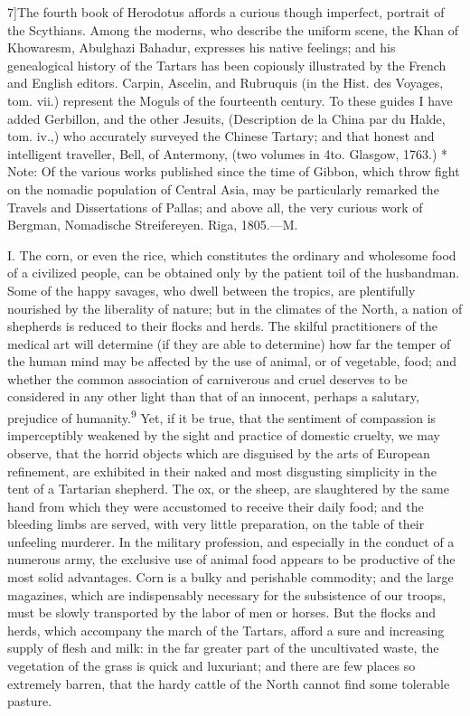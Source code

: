 7]{The fourth book of Herodotus affords a curious
though imperfect, portrait of the Scythians. Among the moderns,
who describe the uniform scene, the Khan of Khowaresm, Abulghazi
Bahadur, expresses his native feelings; and his genealogical
history of the Tartars has been copiously illustrated by the
French and English editors. Carpin, Ascelin, and Rubruquis (in
the Hist. des Voyages, tom. vii.) represent the Moguls of the
fourteenth century. To these guides I have added Gerbillon, and
the other Jesuits, (Description de la China par du Halde, tom.
iv.,) who accurately surveyed the Chinese Tartary; and that
honest and intelligent traveller, Bell, of Antermony, (two
volumes in 4to. Glasgow, 1763.) * Note: Of the various works
published since the time of Gibbon, which throw fight on the
nomadic population of Central Asia, may be particularly remarked
the Travels and Dissertations of Pallas; and above all, the very
curious work of Bergman, Nomadische Streifereyen. Riga, 1805.—M.}


I. The corn, or even the rice, which constitutes the ordinary and
wholesome food of a civilized people, can be obtained only by the
patient toil of the husbandman. Some of the happy savages, who
dwell between the tropics, are plentifully nourished by the
liberality of nature; but in the climates of the North, a nation
of shepherds is reduced to their flocks and herds. The skilful
practitioners of the medical art will determine (if they are able
to determine) how far the temper of the human mind may be
affected by the use of animal, or of vegetable, food; and whether
the common association of carniverous and cruel deserves to be
considered in any other light than that of an innocent, perhaps a
salutary, prejudice of humanity.\textsuperscript{9} Yet, if it be true, that the
sentiment of compassion is imperceptibly weakened by the sight
and practice of domestic cruelty, we may observe, that the horrid
objects which are disguised by the arts of European refinement,
are exhibited in their naked and most disgusting simplicity in
the tent of a Tartarian shepherd. The ox, or the sheep, are
slaughtered by the same hand from which they were accustomed to
receive their daily food; and the bleeding limbs are served, with
very little preparation, on the table of their unfeeling
murderer. In the military profession, and especially in the
conduct of a numerous army, the exclusive use of animal food
appears to be productive of the most solid advantages. Corn is a
bulky and perishable commodity; and the large magazines, which
are indispensably necessary for the subsistence of our troops,
must be slowly transported by the labor of men or horses. But the
flocks and herds, which accompany the march of the Tartars,
afford a sure and increasing supply of flesh and milk: in the far
greater part of the uncultivated waste, the vegetation of the
grass is quick and luxuriant; and there are few places so
extremely barren, that the hardy cattle of the North cannot find
some tolerable pasture.

